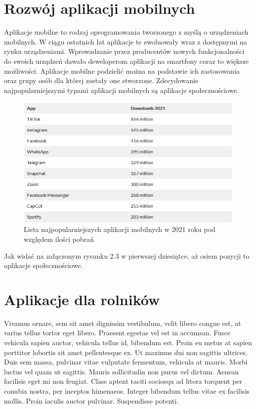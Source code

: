 \documentclass[a4paper,12pt,oneside]{book}
\begin{document}
	\section{Rozwój aplikacji mobilnych}
	Aplikacje mobilne to rodzaj oprogramowania tworzonego z myślą o urządzeniach mobilnych. W ciągu ostatnich lat aplikacje te ewoluowały wraz z dostępnymi na rynku urządzeniami. Wprowadzanie przez producentów nowych funkcjonalności do swoich urządzeń dawało deweloperom aplikacji na smartfony coraz to większe możliwości. Aplikacje mobilne podzielić można na podstawie ich zastosowania oraz grupy osób dla której zostały one stworzone. Zdecydowanie najpopularniejszymi typami aplikacji mobilnych są aplikacje społecznościowe.
	
	\begin{figure}[h]
		\centering
		\includegraphics[width=1\textwidth]{grafika/most_popular_apps_2021.png}
		\caption{Lista najpopularniejszych aplikacji mobilnych w 2021 roku pod względem ilości pobrań}
	\end{figure}

	Jak widać na załączonym rysunku 2.3 w pierwszej dziesiątce, aż osiem pozycji to aplikacje społecznościowe. 
	
	\section{Aplikacje dla rolników}
	Vivamus ornare, sem sit amet dignissim vestibulum, velit libero congue est, at varius tellus tortor eget libero. Praesent egestas vel est in accumsan. Fusce vehicula sapien auctor, vehicula tellus id, bibendum est. Proin eu metus at sapien porttitor lobortis sit amet pellentesque ex. Ut maximus dui non sagittis ultrices. Duis sem massa, pulvinar vitae vulputate fermentum, vehicula at mauris. Morbi luctus vel quam ut sagittis. Mauris sollicitudin non purus vel dictum. Aenean facilisis eget mi non feugiat. Class aptent taciti sociosqu ad litora torquent per conubia nostra, per inceptos himenaeos. Integer bibendum tellus vitae ex facilisis mollis. Proin iaculis auctor pulvinar. Suspendisse potenti.
	
\end{document}
